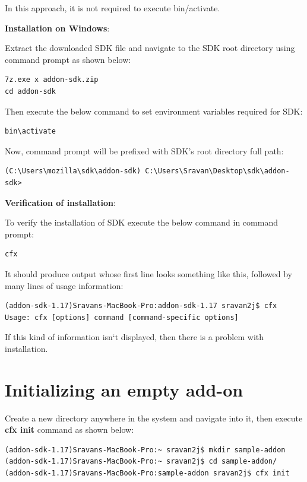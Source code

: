 In this approach, it is not required to execute bin/activate.

\noindent
\textbf{Installation on Windows}:

Extract the downloaded SDK file and navigate to the SDK root directory using command prompt as shown below:
\begin{lstlisting}[frame=none,numbers=none]
7z.exe x addon-sdk.zip
cd addon-sdk
\end{lstlisting}


Then execute the below command to set environment variables required for SDK:
\begin{lstlisting}[frame=none,numbers=none]
bin\activate
\end{lstlisting}


Now, command prompt will be prefixed with SDK's root directory full path:
\begin{lstlisting}[frame=none,numbers=none]
(C:\Users\mozilla\sdk\addon-sdk) C:\Users\Sravan\Desktop\sdk\addon-sdk>
\end{lstlisting}


\noindent
\textbf{Verification of installation}:

To verify the installation of SDK execute the below command in command prompt:
\begin{lstlisting}[frame=none,numbers=none]
cfx
\end{lstlisting}


It should produce output whose first line looks something like this, followed by many lines of usage information:
\begin{lstlisting}[frame=none,numbers=none,mathescape=false]
(addon-sdk-1.17)Sravans-MacBook-Pro:addon-sdk-1.17 sravan2j$ cfx
Usage: cfx [options] command [command-specific options]
\end{lstlisting}

If this kind of information isn`t displayed, then there is a problem with installation.


\section{Initializing an empty add-on}

Create a new directory anywhere in the system and navigate into it, then execute \textbf{cfx init} command as shown below:
\begin{lstlisting}[frame=none,numbers=none,mathescape=false]
(addon-sdk-1.17)Sravans-MacBook-Pro:~ sravan2j$ mkdir sample-addon
(addon-sdk-1.17)Sravans-MacBook-Pro:~ sravan2j$ cd sample-addon/
(addon-sdk-1.17)Sravans-MacBook-Pro:sample-addon sravan2j$ cfx init
\end{lstlisting}

